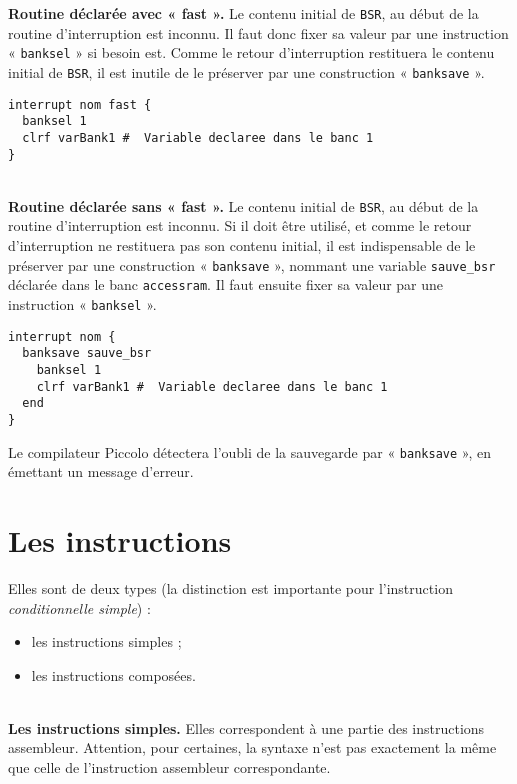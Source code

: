 \textbf{Routine déclarée avec « fast ».} Le contenu initial de \texttt{BSR}, au début de la routine d’interruption est inconnu. Il faut donc fixer sa valeur par une instruction « \texttt{banksel} » si besoin est. Comme le retour d’interruption restituera le contenu initial de \texttt{BSR}, il est inutile de le préserver par une construction « \texttt{banksave} ».

\begin{lstlisting}[language=piccolo]
interrupt nom fast {
  banksel 1
  clrf varBank1 #  Variable declaree dans le banc 1
}
\end{lstlisting}

~\\
\textbf{Routine déclarée sans « fast ».} Le contenu initial de \texttt{BSR}, au début de la routine d’interruption est inconnu. Si il doit être utilisé, et comme le retour d’interruption ne restituera pas son contenu initial, il est indispensable de le préserver par une construction « \texttt{banksave} », nommant une variable \texttt{sauve\_bsr} déclarée dans le banc \texttt{accessram}. Il faut ensuite fixer sa valeur par une instruction « \texttt{banksel} ». 

\begin{lstlisting}[language=piccolo]
interrupt nom {
  banksave sauve_bsr
    banksel 1
    clrf varBank1 #  Variable declaree dans le banc 1
  end
}
\end{lstlisting}

Le compilateur Piccolo détectera l’oubli de la sauvegarde par « \texttt{banksave} », en émettant un message d’erreur.


\section{Les instructions}

Elles sont de deux types (la distinction est importante pour l’instruction \emph{conditionnelle simple}) :
\begin{itemize}
  \item les instructions simples ;
  \item les instructions composées.

\end{itemize}


~\\
\textbf{Les instructions simples.} Elles correspondent à une partie des instructions assembleur. Attention, pour certaines, la syntaxe n'est pas exactement la même que celle de l'instruction assembleur correspondante.

